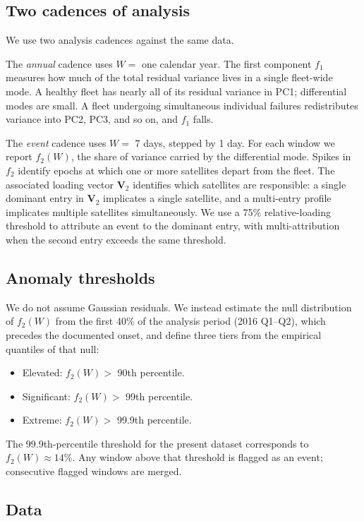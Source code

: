 \documentclass[11pt,a4paper]{article}
\begin{document}
\subsection{Two cadences of analysis}

We use two analysis cadences against the same data.

The \emph{annual} cadence uses $W = $ one calendar year. The first component $f_1$ measures how much of the total residual variance lives in a single fleet-wide mode. A healthy fleet has nearly all of its residual variance in PC1; differential modes are small. A fleet undergoing simultaneous individual failures redistributes variance into PC2, PC3, and so on, and $f_1$ falls.

The \emph{event} cadence uses $W = $ 7 days, stepped by 1 day. For each window we report $f_2(W)$, the share of variance carried by the differential mode. Spikes in $f_2$ identify epochs at which one or more satellites depart from the fleet. The associated loading vector $\mathbf{V}_2$ identifies which satellites are responsible: a single dominant entry in $\mathbf{V}_2$ implicates a single satellite, and a multi-entry profile implicates multiple satellites simultaneously. We use a 75\% relative-loading threshold to attribute an event to the dominant entry, with multi-attribution when the second entry exceeds the same threshold.

\subsection{Anomaly thresholds}

We do not assume Gaussian residuals. We instead estimate the null distribution of $f_2(W)$ from the first 40\% of the analysis period (2016 Q1--Q2), which precedes the documented onset, and define three tiers from the empirical quantiles of that null:
\begin{itemize}
    \item Elevated: $f_2(W) > $ 90th percentile.
    \item Significant: $f_2(W) > $ 99th percentile.
    \item Extreme: $f_2(W) > $ 99.9th percentile.
\end{itemize}
The 99.9th-percentile threshold for the present dataset corresponds to $f_2(W) \approx 14\%$. Any window above that threshold is flagged as an event; consecutive flagged windows are merged.

\subsection{Data}
\end{document}
